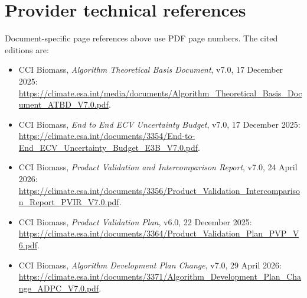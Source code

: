 \documentclass[11pt,a4paper]{article}
\begin{document}
\section{Provider technical references}
Document-specific page references above use PDF page numbers. The cited editions are:
\begin{itemize}
\item CCI Biomass, \emph{Algorithm Theoretical Basis Document}, v7.0, 17 December 2025: \url{https://climate.esa.int/media/documents/Algorithm_Theoretical_Basis_Document_ATBD_V7.0.pdf}.
\item CCI Biomass, \emph{End to End ECV Uncertainty Budget}, v7.0, 17 December 2025: \url{https://climate.esa.int/documents/3354/End-to-End_ECV_Uncertainty_Budget_E3B_V7.0.pdf}.
\item CCI Biomass, \emph{Product Validation and Intercomparison Report}, v7.0, 24 April 2026: \url{https://climate.esa.int/documents/3356/Product_Validation_Intercomparison_Report_PVIR_V7.0.pdf}.
\item CCI Biomass, \emph{Product Validation Plan}, v6.0, 22 December 2025: \url{https://climate.esa.int/documents/3364/Product_Validation_Plan_PVP_V6.pdf}.
\item CCI Biomass, \emph{Algorithm Development Plan Change}, v7.0, 29 April 2026: \url{https://climate.esa.int/documents/3371/Algorithm_Development_Plan_Change_ADPC_V7.0.pdf}.
\end{itemize}
\end{document}

